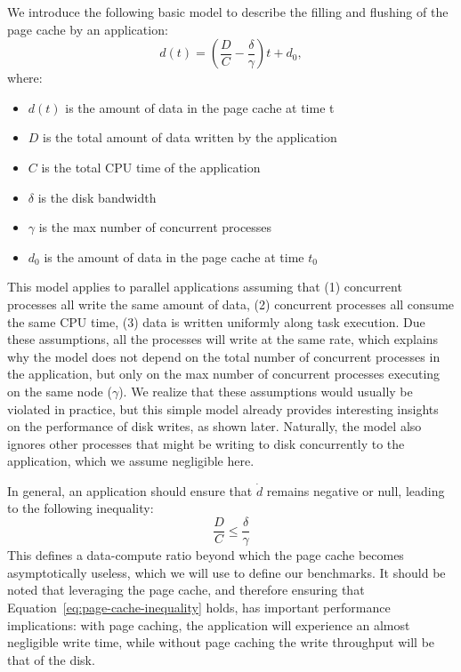 \documentclass{IEEEtran}
\begin{document}
We introduce the following basic model to describe the filling and 
flushing of the page cache by an application:
$$
d(t) = \left( \frac{D}{C} - \frac{\delta}{\gamma} \right)t + d_0,
$$
where:
\begin{itemize}
\item $d(t)$ is the amount of data in the page cache at time t
\item $D$ is the total amount of data written by the application
\item $C$ is the total CPU time of the application
\item $\delta$ is the disk bandwidth
\item $\gamma$ is the max number of concurrent processes
\item $d_0$ is the amount of data in the page cache at time $t_0$
\end{itemize}

This model applies to parallel applications assuming that (1) 
concurrent processes all write the same amount of data, (2) 
concurrent processes all consume the same CPU time, (3) data is written 
uniformly along task execution. Due these assumptions, all the 
processes will write at the same rate, which explains why the model 
does not depend on the total number of concurrent processes in the 
application, but only on the max number of concurrent processes 
executing on the same node ($\gamma$). We realize that these 
assumptions would usually be violated in practice, but this simple 
model already provides interesting insights on the performance of disk 
writes, as shown later. Naturally, the model also ignores other 
processes that might be writing to disk concurrently to the 
application, which we assume negligible here. 

In general, an application should ensure that $\dot d$ remains negative 
or null, leading to the following inequality:
\begin{equation}
\frac{D}{C} \leq \frac{\delta}{\gamma} \label{eq:page-cache-inequality}
\end{equation}
This defines a data-compute ratio beyond which the page cache becomes 
asymptotically useless, which we will use to define our benchmarks. It 
should be noted that leveraging the page cache, and therefore ensuring 
that Equation~\ref{eq:page-cache-inequality} holds, has important 
performance implications: with page caching, the application will 
experience an almost negligible write time, while without page caching 
the write throughput will be that of the disk.
\end{document}
